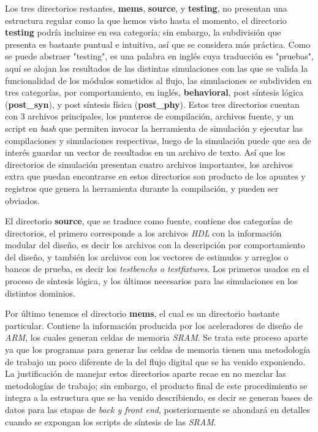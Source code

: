 Los tres directorios restantes, \textbf{mems}, \textbf{source}, y \textbf{testing}, no presentan una estructura regular como la que hemos visto hasta el momento, el directorio \textbf{testing} podría incluirse en esa categoría; sin embargo, la subdivisión que presenta es bastante puntual e intuitiva, así que se considera más práctica. Como se puede abstraer "testing", es una palabra en inglés cuya traducción es "pruebas", aquí se alojan los resultados de las distintas simulaciones con las que se valida la funcionalidad de los módulos sometidos al flujo, las simulaciones se subdividen en tres categorías, por comportamiento, en inglés, \textbf{behavioral}, post síntesis lógica (\textbf{post\_syn}), y post síntesis física (\textbf{post\_phy}). Estos tres directorios cuentan con 3 archivos principales, los punteros de compilación, archivos fuente, y un script en \textit{bash} que permiten invocar la herramienta de simulación y ejecutar las compilaciones y simulaciones respectivas, luego de la simulación puede que sea de interés guardar un vector de resultados en un archivo de texto. Así que los directorios de simulación presentan cuatro archivos importantes, los archivos extra que puedan encontrarse en estos directorios son producto de los apuntes y registros que genera la herramienta durante la compilación, y pueden ser obviados.

El directorio \textbf{source}, que se traduce como fuente, contiene dos categorías de directorios, el primero corresponde a los archivos \textit{HDL} con la información modular del diseño, es decir los archivos con la descripción por comportamiento del diseño, y también los archivos con los vectores de estimulos y arreglos o bancos de prueba, es decir los \textit{testbenchs o testfixtures}. Los primeros usados en el proceso de síntesis lógica, y los últimos necesarios para las simulaciones en los distintos dominios.

Por último tenemos el directorio \textbf{mems}, el cual es un directorio bastante particular. Contiene la información producida por los aceleradores de diseño de \textit{ARM}, los cuales generan celdas de memoria \textit{SRAM}. Se trata este proceso aparte ya que los programas para generar las celdas de memoria tienen una metodología de trabajo un poco diferente de la del flujo digital que se ha venido exponiendo. La justificación de manejar estos directorios aparte recae en no mezclar las metodologías de trabajo; sin embargo, el producto final de este procedimiento se integra a la estructura que se ha venido describiendo, es decir se generan bases de datos para las etapas de \textit {back y front end}, posteriormente se ahondará en detalles cuando se expongan los scripts de síntesis de las \textit{SRAM}.

